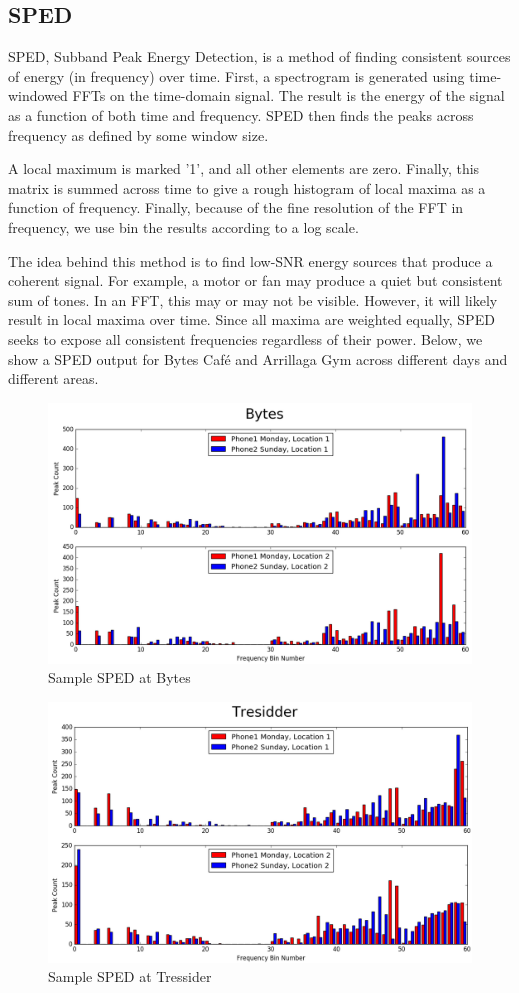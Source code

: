 \documentclass[journal]{IEEEtran}
\begin{document}
\subsection{SPED}
SPED, Subband Peak Energy Detection, is a method of finding consistent sources of energy (in frequency) over time. First, a spectrogram is generated using time-windowed FFTs on the time-domain signal. The result is the energy of the signal as a function of both time and frequency. SPED then finds the peaks across frequency as defined by some window size. 

A local maximum is marked '1', and all other elements are zero. Finally, this matrix is summed across time to give a rough histogram of local maxima as a function of frequency. Finally, because of the fine resolution of the FFT in frequency, we use bin the results according to a log scale.

The idea behind this method is to find low-SNR energy sources that produce a coherent signal. For example, a motor or fan may produce a quiet but consistent sum of tones. In an FFT, this may or may not be visible. However, it will likely result in local maxima over time. Since all maxima are weighted equally, SPED seeks to expose all consistent frequencies regardless of their power. Below, we show a SPED output for Bytes Caf\'e and Arrillaga Gym across different days and different areas. 
\begin{figure}[H]
	\centering
	\includegraphics[width=0.9\linewidth]{bytes_sped}
	\caption{Sample SPED at Bytes}
	\label{fig:bytes_sped}
\end{figure}
\begin{figure}[H]
	\centering
	\includegraphics[width=0.9\linewidth]{tressider_sped}
	\caption{Sample SPED at Tressider}
	\label{fig:bytes_tressider}
\end{figure}
\end{document}
